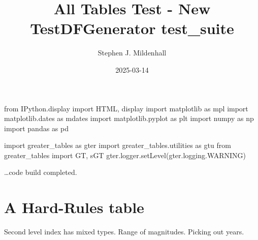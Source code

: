 \documentclass[
  11pt,
  a4paper,
  DIV=11,
  numbers=noendperiod]{scrartcl}
\title{All Tables Test - New TestDFGenerator test\_suite}
\author{Stephen J. Mildenhall}
\date{2025-03-14}
\newenvironment{Shaded}{\begin{snugshade}}{\end{snugshade}}
\newcommand{\ImportTok}[1]{\textcolor[rgb]{0.00,0.46,0.62}{#1}}
\newcommand{\NormalTok}[1]{\textcolor[rgb]{0.00,0.23,0.31}{#1}}
\begin{document}
\maketitle


\label{setup}
\begin{Shaded}
\begin{Highlighting}[]
\ImportTok{from}\NormalTok{ IPython.display }\ImportTok{import}\NormalTok{ HTML, display}
\ImportTok{import}\NormalTok{ matplotlib }\ImportTok{as}\NormalTok{ mpl}
\ImportTok{import}\NormalTok{ matplotlib.dates }\ImportTok{as}\NormalTok{ mdates}
\ImportTok{import}\NormalTok{ matplotlib.pyplot }\ImportTok{as}\NormalTok{ plt}
\ImportTok{import}\NormalTok{ numpy }\ImportTok{as}\NormalTok{ np}
\ImportTok{import}\NormalTok{ pandas }\ImportTok{as}\NormalTok{ pd}

\ImportTok{import}\NormalTok{ greater\_tables }\ImportTok{as}\NormalTok{ gter}
\ImportTok{import}\NormalTok{ greater\_tables.utilities }\ImportTok{as}\NormalTok{ gtu}
\ImportTok{from}\NormalTok{ greater\_tables }\ImportTok{import}\NormalTok{ GT, sGT}
\NormalTok{gter.logger.setLevel(gter.logging.WARNING)}
\end{Highlighting}
\end{Shaded}

\ldots code build completed.

\section{A Hard-Rules table}\label{a-hard-rules-table}

Second level index has mixed types. Range of magnitudes. Picking out
years.
\end{document}
